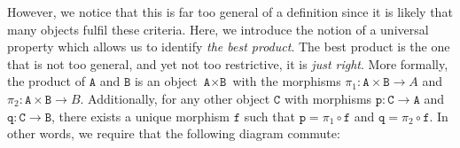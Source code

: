\documentclass[12pt,twoside,maitrise]{dms}
\theoremstyle{definition}
\numberwithin{equation}{section}
\numberwithin{table}{chapter}
\numberwithin{figure}{chapter}
\newcommand\id[1] {\texttt{#1}}
\begin{document}
However, we notice that this is far too general of a definition since it is
likely that many objects fulfil these criteria. Here, we
introduce the notion of a universal property which allows us to identify
\emph{the best product}. The best product is the one that is not too general,
and yet not too restrictive, it is \emph{just right}. More formally, the product
of $\id{A}$ and $\id{B}$ is an object $\id{A} \times \id{B}$ with the morphisms
$\pi_1 : \id{A} \times \id{B} \rightarrow A$ and $\pi_2 : \id{A} \times \id{B}
\rightarrow B$. Additionally, for any other object $\id{C}$ with morphisms
$\id{p} : \id{C} \rightarrow \id{A}$ and $\id{q} : \id{C} \rightarrow \id{B}$,
there exists a unique morphism $\id{f}$ such that $\id{p} = \pi_1 \circ \id{f}$
and $\id{q} = \pi_2 \circ \id{f}$. In other words, we require that the following
diagram commute:
\end{document}
